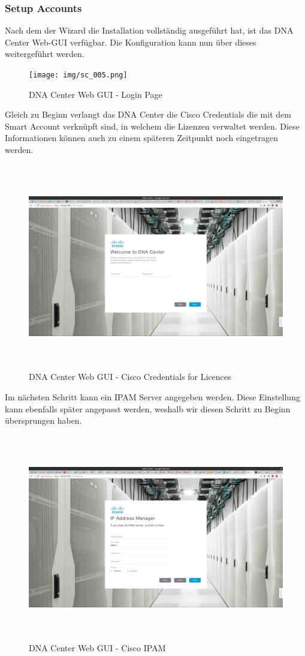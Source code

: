 \subsubsection{Setup Accounts}
Nach dem der Wizard die Installation vollständig ausgeführt hat, ist das DNA Center Web-GUI verfügbar. Die Konfiguration kann nun über dieses weitergeführt werden.
\begin{figure}[H]
	\centering
	\texttt{[image: img/sc\_005.png]}
	\caption{DNA Center Web GUI - Login Page}
	\label{fig:dna-center-gui-1}
\end{figure}

Gleich zu Beginn verlangt das DNA Center die Cisco Credentials die mit dem Smart Account verknüpft sind, in welchem die Lizenzen verwaltet werden. Diese Informationen können auch zu einem späteren Zeitpunkt noch eingetragen werden.

\begin{figure}[H]
	\centering
	\includegraphics[height=9cm]{img/sc_006.png}
	\caption{DNA Center Web GUI - Cisco Credentials for Licences}
	\label{fig:dna-center-gui-2}
\end{figure}

Im nächsten Schritt kann ein IPAM Server angegeben werden. Diese Einstellung kann ebenfalls später angepasst werden, weshalb wir diesen Schritt zu Beginn übersprungen haben.

\begin{figure}[H]
	\centering
	\includegraphics[height=9cm]{img/sc_007.png}
	\caption{DNA Center Web GUI - Cisco IPAM}
	\label{fig:dna-center-gui-3}
\end{figure}

